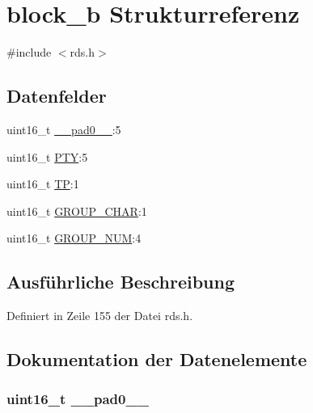 \hypertarget{structblock__b}{}\section{block\+\_\+b Strukturreferenz}
\label{structblock__b}


{\ttfamily \#include $<$rds.\+h$>$}

\subsection*{Datenfelder}
\begin{DoxyCompactItemize}
\item 
uint16\+\_\+t \hyperlink{structblock__b_a77132c2c26a75f5b8751b235cda23828}{\+\_\+\+\_\+pad0\+\_\+\+\_\+}\+:5
\item 
uint16\+\_\+t \hyperlink{structblock__b_a0474967478fbbc2c71b800d2e0132d45}{P\+T\+Y}\+:5
\item 
uint16\+\_\+t \hyperlink{structblock__b_ab9e634c63b0d95a96716d5f6d7f06d72}{T\+P}\+:1
\item 
uint16\+\_\+t \hyperlink{structblock__b_a66d4119990dc4c3e040a43885e9bb953}{G\+R\+O\+U\+P\+\_\+\+C\+H\+A\+R}\+:1
\item 
uint16\+\_\+t \hyperlink{structblock__b_a9f692e9f76ee88348d426bcd4e9bc70b}{G\+R\+O\+U\+P\+\_\+\+N\+U\+M}\+:4
\end{DoxyCompactItemize}


\subsection{Ausführliche Beschreibung}


Definiert in Zeile 155 der Datei rds.\+h.



\subsection{Dokumentation der Datenelemente}
\hypertarget{structblock__b_a77132c2c26a75f5b8751b235cda23828}{}
\subsubsection[{\+\_\+\+\_\+pad0\+\_\+\+\_\+}]{\setlength{\rightskip}{0pt plus 5cm}uint16\+\_\+t \+\_\+\+\_\+pad0\+\_\+\+\_\+}\label{structblock__b_a77132c2c26a75f5b8751b235cda23828}



